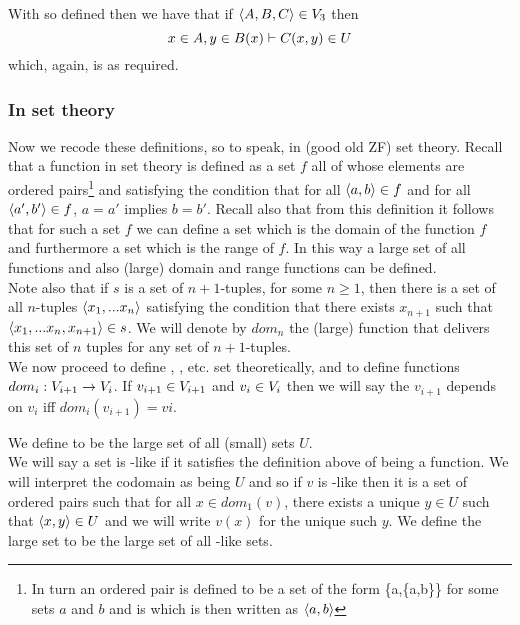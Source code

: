 \documentclass[10pt,a4paper]{scrartcl}
\begin{document}
\noindent
With \varset[3] so defined then we have that if $\tuple{A,B,C} \in \varset[3]$ then
\begin{equation*}
x \in A, y \in B(x) \tstyle C(x,y) \in U 
\end{equation*}
which, again, is as required.

\subsubsection{In set theory}
Now we recode these definitions, so to speak, in (good old ZF) set theory.
Recall that a function in set theory is defined as a set $f$ all of whose elements are ordered pairs\footnote{In turn an ordered pair is defined to be a set of the form \{a,\{a,b\}\} for some sets $a$ and $b$ and is which is then written as $\tuple{a,b}$} 
and satisfying the condition that for all 
 $\tuple{a,b} \in f$ and for all $\tuple{a',b'} \in f$, $a=a'$ implies $b=b'$. Recall also that from this definition it follows that for such a set $f$ we can define a set which is the domain of the function $f$ and furthermore a set which is the range of $f$. In this way
a large set of all functions and also (large) domain and range functions can be defined. \\ 

\noindent Note also that if $s$ is a set of $n+1$-tuples, for some $n \geq 1$, then there 
is a set of
all $n$-tuples $\tuple{x_1,...x_n}$ satisfying the condition that there exists $x_{n+1}$ 
such that $\tuple{x_1,...x_n,x_{n+1}} \in s$. 
We will denote by $dom_n$ the (large) function that delivers this 
	set of $n$ tuples for any set of $n+1$-tuples. \\
	
\noindent
We now proceed to  define \varset[2], \varset[3], etc. set theoretically, and to define functions 
$dom_i: \varset[i+1] \morph \varset[i]$. If $v_{i+1} \in \varset[i+1]$ and $v_i \in \varset[i]$
then we will say the $v_{i+1}$ depends on $v_i$ iff $dom_i(v_{i+1})=v{i}$.

\noindent
We define \varset[1] to be the large set of all (small) sets $U$. \\

\noindent
We will say a set is \varset[2]-like if it satisfies the definition above of being a function. We will interpret the codomain as being $U$ and so if $v$ is \varset[2]-like then it is a set of ordered pairs such that for all $x \in dom_1(v)$, there exists a unique $y \in U$ such that
$\tuple{x,y} \in U$ and we will write $v(x)$ for the unique such $y$. We define the large set \varset[2] to be the large set of all \varset[2]-like  sets.\\
\end{document}
